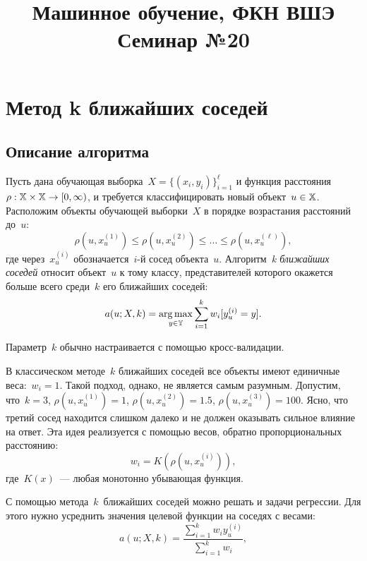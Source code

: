 \documentclass[12pt,fleqn]{article}
\begin{document}
\title{Машинное обучение, ФКН ВШЭ\\Семинар №20}
\author{}
\date{}
\maketitle


\section{Метод k ближайших соседей}
    \subsection{Описание алгоритма}
        Пусть дана обучающая выборка~$X = \{ (x_i, y_i)\}_{i = 1}^{\ell}$
        и функция расстояния~$\rho: \XX \times \XX \to [0, \infty)$,
        и требуется классифицировать новый объект~$u \in \mathbb{X}$.
        Расположим объекты обучающей выборки~$X$ в порядке возрастания
        расстояний до~$u$:
        \[
            \rho(u, x_u^{(1)})
            \leq
            \rho(u, x_u^{(2)})
            \leq
            \dots
            \leq
            \rho(u, x_u^{(\ell)}),
        \]
        где через~$x_u^{(i)}$ обозначается~$i$-й сосед объекта~$u$.
        Алгоритм~\emph{k ближайших соседей} относит объект~$u$ к тому классу,
        представителей которого окажется больше всего среди~$k$ его ближайших соседей:
        \[
            a(u; X, k) = \mathop{\rm arg\,max}\limits_{y \in \mathbb{Y}} \sum_{i = 1}^{k} w_i [y_u^{(i)} = y].
        \]

        Параметр~$k$ обычно настраивается с помощью кросс-валидации.

        В классическом методе~$k$ ближайших соседей все объекты имеют единичные веса:~$w_i = 1$.
        Такой подход, однако, не является самым разумным.
        Допустим, что~$k = 3$, $\rho(u, x_u^{(1)}) = 1$, $\rho(u, x_u^{(2)}) = 1.5$,
        $\rho(u, x_u^{(3)}) = 100$.
        Ясно, что третий сосед находится слишком далеко и не должен оказывать сильное влияние на ответ.
        Эта идея реализуется с помощью весов, обратно пропорциональных расстоянию:
        \[
            w_i
            =
            K \left(
                \rho(u, x_u^{(i)})
            \right),
        \]
        где~$K(x)$~--- любая монотонно убывающая функция.

        С помощью метода~$k$~ближайших соседей можно решать и задачи регрессии.
        Для этого нужно усреднить значения целевой функции на соседях с весами:
        \[
            a(u; X, k)
            =
            \frac{
                \sum_{i = 1}^{k}
                    w_i y_u^{(i)}
            }{
                \sum_{i = 1}^{k}
                    w_i
            },
        \]
\end{document}
